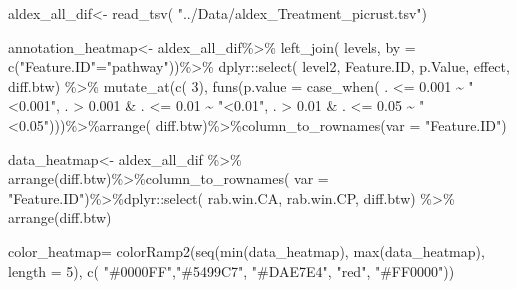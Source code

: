 \documentclass[]{interact}
\theoremstyle{plain}%
\theoremstyle{definition}
\theoremstyle{remark}
\newenvironment{Shaded}{\begin{snugshade}}{\end{snugshade}}
\newcommand{\AttributeTok}[1]{\textcolor[rgb]{0.77,0.63,0.00}{#1}}
\newcommand{\DecValTok}[1]{\textcolor[rgb]{0.00,0.00,0.81}{#1}}
\newcommand{\FloatTok}[1]{\textcolor[rgb]{0.00,0.00,0.81}{#1}}
\newcommand{\FunctionTok}[1]{\textcolor[rgb]{0.00,0.00,0.00}{#1}}
\newcommand{\NormalTok}[1]{#1}
\newcommand{\OtherTok}[1]{\textcolor[rgb]{0.56,0.35,0.01}{#1}}
\newcommand{\SpecialCharTok}[1]{\textcolor[rgb]{0.00,0.00,0.00}{#1}}
\newcommand{\StringTok}[1]{\textcolor[rgb]{0.31,0.60,0.02}{#1}}
\begin{document}
\begin{Shaded}
\begin{Highlighting}[]
\NormalTok{aldex\_all\_dif}\OtherTok{\textless{}{-}} \FunctionTok{read\_tsv}\NormalTok{( }\StringTok{"../Data/aldex\_Treatment\_picrust.tsv"}\NormalTok{)}

\NormalTok{annotation\_heatmap}\OtherTok{\textless{}{-}}\NormalTok{ aldex\_all\_dif}\SpecialCharTok{\%\textgreater{}\%} \FunctionTok{left\_join}\NormalTok{(}
\NormalTok{  levels, }\AttributeTok{by =} \FunctionTok{c}\NormalTok{(}\StringTok{"Feature.ID"}\OtherTok{=}\StringTok{"pathway"}\NormalTok{))}\SpecialCharTok{\%\textgreater{}\%}\NormalTok{ dplyr}\SpecialCharTok{::}\FunctionTok{select}\NormalTok{(}
\NormalTok{  level2, Feature.ID, p.Value, effect, diff.btw) }\SpecialCharTok{\%\textgreater{}\%} \FunctionTok{mutate\_at}\NormalTok{(}\FunctionTok{c}\NormalTok{(}
    \DecValTok{3}\NormalTok{), }\FunctionTok{funs}\NormalTok{(}\AttributeTok{p.value =} \FunctionTok{case\_when}\NormalTok{(}
\NormalTok{    . }\SpecialCharTok{\textless{}=} \FloatTok{0.001} \SpecialCharTok{\textasciitilde{}} \StringTok{"\textless{}0.001"}\NormalTok{,}
\NormalTok{    . }\SpecialCharTok{\textgreater{}}  \FloatTok{0.001} \SpecialCharTok{\&}\NormalTok{ .  }\SpecialCharTok{\textless{}=} \FloatTok{0.01} \SpecialCharTok{\textasciitilde{}} \StringTok{"\textless{}0.01"}\NormalTok{,}
\NormalTok{    . }\SpecialCharTok{\textgreater{}}  \FloatTok{0.01} \SpecialCharTok{\&}\NormalTok{ .  }\SpecialCharTok{\textless{}=} \FloatTok{0.05} \SpecialCharTok{\textasciitilde{}} \StringTok{"\textless{}0.05"}\NormalTok{)))}\SpecialCharTok{\%\textgreater{}\%}\FunctionTok{arrange}\NormalTok{(}
\NormalTok{      diff.btw)}\SpecialCharTok{\%\textgreater{}\%}\FunctionTok{column\_to\_rownames}\NormalTok{(}\AttributeTok{var =} \StringTok{"Feature.ID"}\NormalTok{)}

\NormalTok{data\_heatmap}\OtherTok{\textless{}{-}}\NormalTok{ aldex\_all\_dif }\SpecialCharTok{\%\textgreater{}\%} \FunctionTok{arrange}\NormalTok{(diff.btw)}\SpecialCharTok{\%\textgreater{}\%}\FunctionTok{column\_to\_rownames}\NormalTok{(}
  \AttributeTok{var =} \StringTok{"Feature.ID"}\NormalTok{)}\SpecialCharTok{\%\textgreater{}\%}\NormalTok{dplyr}\SpecialCharTok{::}\FunctionTok{select}\NormalTok{(}
\NormalTok{    rab.win.CA, rab.win.CP, diff.btw) }\SpecialCharTok{\%\textgreater{}\%} \FunctionTok{arrange}\NormalTok{(diff.btw)}

\NormalTok{color\_heatmap}\OtherTok{=} \FunctionTok{colorRamp2}\NormalTok{(}\FunctionTok{seq}\NormalTok{(}\FunctionTok{min}\NormalTok{(data\_heatmap), }\FunctionTok{max}\NormalTok{(data\_heatmap), }\AttributeTok{length =} \DecValTok{5}\NormalTok{), }\FunctionTok{c}\NormalTok{(}
  \StringTok{"\#0000FF"}\NormalTok{,}\StringTok{"\#5499C7"}\NormalTok{, }\StringTok{"\#DAE7E4"}\NormalTok{,  }\StringTok{"red"}\NormalTok{, }\StringTok{"\#FF0000"}\NormalTok{))}


\end{Highlighting}
\end{Shaded}
\end{document}
